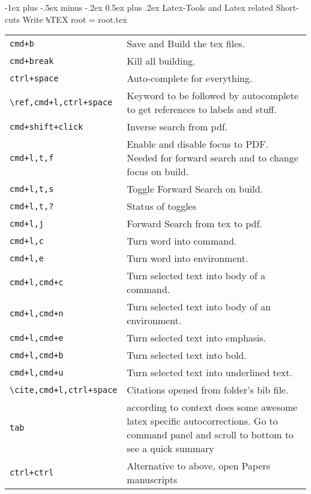 \documentclass[12pt,landscape]{article}
\makeatletter
\renewcommand{\section}{\@startsection{section}{1}{0mm}%
                                {-1ex plus -.5ex minus -.2ex}%
                                {0.5ex plus .2ex}%
                                {\normalfont\large\bfseries}}
\makeatother
\begin{document}
\begin{multicols}{2}
\section{Latex-Tools and Latex related Short-cuts}
\label{Latex}
Write \verb!%!TEX root = root.tex
\begin{tabular}{p{3in}  p{6in}}
\verb!cmd+b!           & Save and Build the tex files. \\
\verb!cmd+break!       & Kill all building. \\
\verb!ctrl+space!       & Auto-complete for everything. \\
\verb!\ref,cmd+l,ctrl+space! & Keyword to be followed by autocomplete to get references to labels and stuff. \\
\verb!cmd+shift+click!  & Inverse search from pdf. \\
\verb!cmd+l,t,f!       & Enable and disable focus to PDF. Needed for forward search and to change focus on build. \\
\verb!cmd+l,t,s!      & Toggle Forward Search on build. \\
\verb!cmd+l,t,?!      & Status of toggles \\
\verb!cmd+l,j!      & Forward Search from tex to pdf. \\
\verb!cmd+l,c!      & Turn word into command. \\
\verb!cmd+l,e!      & Turn word into environment. \\
\verb!cmd+l,cmd+c!    & Turn selected text into body of a command. \\
\verb!cmd+l,cmd+n!    & Turn selected text into body of an environment. \\
\verb!cmd+l,cmd+e!    & Turn selected text into emphasis. \\
\verb!cmd+l,cmd+b!    & Turn selected text into bold. \\
\verb!cmd+l,cmd+u!    & Turn selected text into underlined text. \\
\verb!\cite,cmd+l,ctrl+space! & Citations opened from folder's bib file. \\ 
\verb!tab!          & according to context does some awesome latex specific autocorrections. Go to command panel and scroll to bottom to see a quick summary\\
\verb!ctrl+ctrl!        & Alternative to above, open Papers manuscripts
\end{tabular}
\end{multicols}
\newpage
\end{document}
